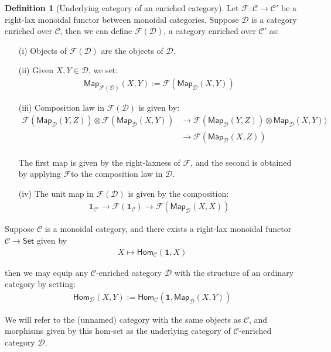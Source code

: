 \documentclass[10pt]{amsart}
\newcommand{\8}{\ensuremath{\infty}}
\newcommand{\0}{\ensuremath{\overset{\rightarrow}{0}}}
\newcommand{\1}{\ensuremath{\mathbf{1}}}
\newcommand{\C}{\ensuremath{\mathscr{C}}}
\newcommand{\D}{\ensuremath{\mathscr{D}}}
\newcommand{\F}{\ensuremath{\mathscr{F}}}
\newcommand{\Set}{\ensuremath{\mathsf{Set}}}
\newcommand{\Hom}{\ensuremath{\mathsf{Hom}}}
\newcommand{\Map}{\ensuremath{\mathsf{Map}}}
\theoremstyle{definition}
\newtheorem{definition}{Definition}[section]
\numberwithin{definition}{subsection}
\numberwithin{definition}{section}
\begin{document}
\begin{definition}[Underlying category of an enriched category]
  Let $\F : \C \rightarrow \C'$ be a right-lax monoidal functor between monoidal categories. Suppose $\D$ is a category enriched over \C, then we can define $\F(\D)$, a category enriched over $\C'$ as:

  \begin{enumerate}
    \item[(i)] Objects of $\F(\D)$ are the objects of $\D$.
    \item[(ii)] Given $X, Y \in \D$, we set:
      \begin{align*}
        \Map_{\F(\D)}(X, Y) := \F(\Map_\D(X, Y))
      \end{align*}
    \item[(iii)] Composition law in $\F(\D)$ is given by:
      \begin{align*}
        \F(\Map_\D(Y, Z)) \otimes \F(\Map_\D(X, Y)) & \rightarrow \F(\Map_\D(Y, Z)) \otimes \Map_\D(X, Y)) \\
                                                    & \rightarrow \F(\Map_\D(X, Z))                        \\
      \end{align*}

      The first map is given by the right-laxness of \F, and the second is obtained by applying \F to the composition law in \D.
    \item[(iv)] The unit map in $\F(\D)$ is given by the composition:
      \begin{align*}
        \1_{\C'} \rightarrow \F(\1_\C) \rightarrow \F(\Map_\D(X, X))
      \end{align*}
  \end{enumerate}

  Suppose $\C$ is a monoidal category, and there exists a right-lax monoidal functor $\C \rightarrow \Set$ given by
  \begin{align*}
    X \mapsto \Hom_\C(\1, X)
  \end{align*}

  then we may equip any \C-enriched category $\D$ with the structure of an ordinary category by setting:
  \begin{align*}
    \Hom_\D(X, Y) := \Hom_\C(\1, \Map_\D(X, Y))
  \end{align*}

  We will refer to the (unnamed) category with the same objects as \C, and morphisms given by this hom-set as the underlying category of \C-enriched category \D.
\end{definition}
\end{document}
